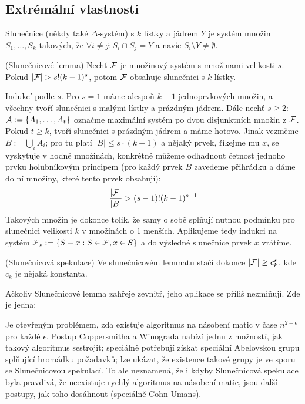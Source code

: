 \subsection{Extrémální vlastnosti}

\df Slunečnice (někdy také $\Delta$-systém) s $k$ lístky a jádrem $Y$ je systém
množin $S_1, \dots, S_k$ takových, že $\forall i\neq j: S_i \cap S_j = Y$ a
navíc $S_i \setminus Y \neq \emptyset$.

\vt (Slunečnicové lemma) Nechť $\mathcal{F}$ je množinový systém s množinami velikosti
$s$.  Pokud $|\mathcal{F}| > s!  (k-1)^s$, potom $\mathcal{F}$ obsahuje slunečnici s $k$ lístky.

\dk Indukcí podle $s$. Pro $s=1$ máme alespoň $k-1$ jednoprvkových množin, a
všechny tvoří slunečnici s malými lístky a prázdným jádrem. Dále nechť $s\geq
2$: $\mathcal{A} := \{A_1, \dots, A_t\}$ označme maximální systém po dvou disjunktních
množin z $\mathcal{F}$. Pokud $t \geq k$, tvoří slunečnici s prázdným jádrem a máme
hotovo. Jinak vezměme $B := \bigcup_i A_i$; pro tu platí $|B| \leq s\cdot (k-1)$
a nějaký prvek, říkejme mu $x$, se vyskytuje v hodně množinách, konkrétně můžeme
odhadnout četnost jednoho prvku holubníkovým principem (pro každý prvek $B$
zavedeme přihrádku a dáme do ní množiny, které tento prvek obsahují):
\begin{align*}
	{|\mathcal{F}| \over |B|} > (s-1)!(k-1)^{s-1}
\end{align*}
Takových množin je dokonce tolik, že samy o sobě splňují nutnou podmínku pro
slunečnici velikosti $k$ v množinách o $1$ menších. Aplikujeme tedy indukci na
systém $\mathcal{F}_x := \{S - x: S \in \mathcal{F}, x \in S\}$ a do výsledné slunečnice prvek
$x$ vrátíme.

\vt (Slunečnicová spekulace) Ve slunečnicovém lemmatu stačí dokonce $|\mathcal{F}| \geq
c_k^s$, kde $c_k$ je nějaká konstanta.

\pzn Ačkoliv Slunečnicové lemma zahřeje zevnitř, jeho aplikace se příliš
nezmiňují. Zde je jedna:

Je otevřeným problémem, zda existuje algoritmus na násobení matic v čase
$n^{2+\epsilon}$ pro každé $\epsilon$. Postup Coppersmitha a Winograda nabízí
jednu z možností, jak takový algoritmus sestrojit; speciálně potřebují získat
speciální Abelovskou grupu splňující hromádku požadavků; lze ukázat, že
existence takové grupy je ve sporu se Slunečnicovou spekulací. To ale
neznamená, že i kdyby Slunečnicová spekulace byla pravdivá, že neexistuje
rychlý algoritmus na násobení matic, jsou další postupy, jak toho dosáhnout
(speciálně Cohn-Umans).


